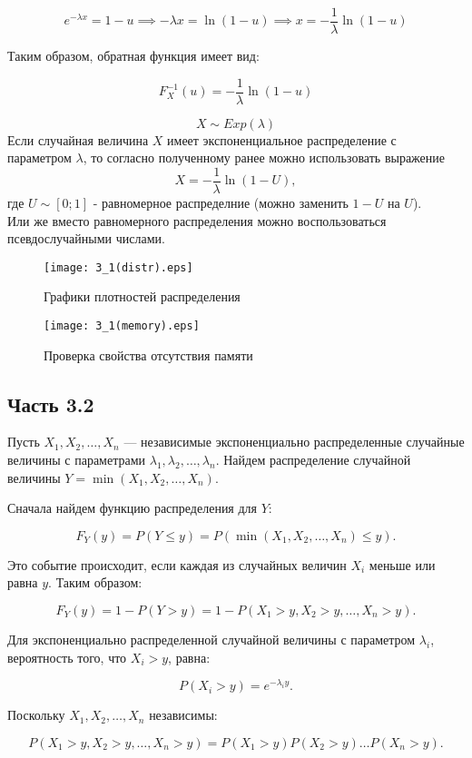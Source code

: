 \documentclass[11pt]{article}
\begin{document}
$$
e^{-\lambda x} = 1 - u \implies -\lambda x = \ln(1 - u) \implies x = -\frac{1}{\lambda} \ln(1 - u)
$$

Таким образом, обратная функция имеет вид:

$$
F_X^{-1}(u) = -\frac{1}{\lambda} \ln(1 - u)
$$

$$X \sim Exp(\lambda)$$
Если случайная величина $X$ имеет экспоненциальное распределение с параметром $\lambda$, то согласно полученному ранее можно использовать выражение
$$
    X = - \frac{1}{\lambda} \ln{(1 - U)},
$$
где $U \sim [0;1]$ - равномерное распределние (можно заменить $1-U$ на $U$). \\
Или же вместо равномерного распределения можно воспользоваться псевдослучайными числами.


\begin{figure}[ht]
    \texttt{[image: 3\_1(distr).eps]} 
    \caption{Графики плотностей распределения}
\end{figure}  


\begin{figure}[ht]
    \texttt{[image: 3\_1(memory).eps]} 
    \caption{Проверка свойства отсутствия памяти}
\end{figure}  
\FloatBarrier
\subsection{Часть 3.2}

Пусть $X_1, X_2, \ldots, X_n$ — независимые экспоненциально распределенные случайные величины с параметрами $\lambda_1, \lambda_2, \ldots, \lambda_n$. Найдем распределение случайной величины $Y = \min(X_1, X_2, \ldots, X_n)$.

Сначала найдем функцию распределения для $Y$:

$$
F_Y(y) = P(Y \leq y) = P(\min(X_1, X_2, \ldots, X_n) \leq y).
$$


Это событие происходит, если каждая из случайных величин $X_i$ меньше или равна $y$. Таким образом:

$$
F_Y(y) = 1 - P(Y > y) = 1 - P(X_1 > y, X_2 > y, \ldots, X_n > y).
$$


Для экспоненциально распределенной случайной величины с параметром $\lambda_i$, вероятность того, что $X_i > y$, равна:

$$
P(X_i > y) = e^{-\lambda_i y}.
$$


Поскольку $X_1, X_2, \ldots, X_n$ независимы:

$$
P(X_1 > y, X_2 > y, \ldots, X_n > y) = P(X_1 > y) P(X_2 > y) \ldots P(X_n > y).
$$
\end{document}
